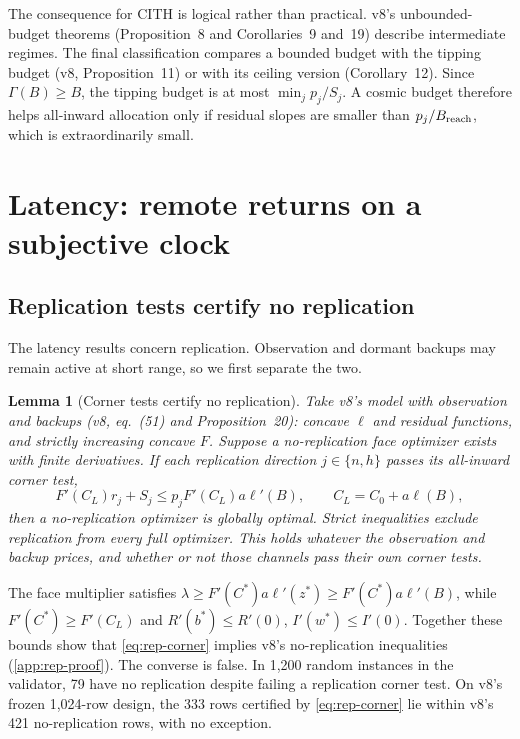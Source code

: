 \documentclass[11pt,a4paper]{article}
\newtheorem{lemma}[proposition]{Lemma}
\theoremstyle{definition}
\newcommand{\CITH}{\textsc{CITH}}
\begin{document}
The consequence for \CITH{} is logical rather than practical. v8's
unbounded-budget theorems (Proposition~8 and Corollaries~9 and~19) describe
intermediate regimes. The final classification compares a bounded budget
with the tipping budget (v8, Proposition~11) or with its ceiling version
(Corollary~12). Since $\Gamma(B)\geq B$, the tipping budget is at most
$\min_jp_j/S_j$. A cosmic budget therefore helps all-inward allocation only if
residual slopes are smaller than $p_j/B_{\rm reach}$, which is extraordinarily
small.

\section{Latency: remote returns on a subjective clock}
\label{sec:latency}
\subsection{Replication tests certify no replication}
The latency results concern replication. Observation and dormant backups may
remain active at short range, so we first separate the two.

\begin{lemma}[Corner tests certify no replication]
\label{lem:rep-certificate}
Take v8's model with observation and backups (v8, eq.~(51) and Proposition~20):
concave $\ell$ and residual functions, and strictly increasing concave $F$. Suppose a
no-replication face optimizer exists with finite derivatives. If each
replication direction $j\in\{n,h\}$ passes its all-inward corner test,
\begin{equation}
 F'(C_L)r_j+S_j\leq p_jF'(C_L)a\ell'(B),\qquad C_L=C_0+a\ell(B),
 \label{eq:rep-corner}
\end{equation}
then a no-replication optimizer is globally optimal. Strict inequalities exclude
replication from every full optimizer. This holds whatever the observation and backup
prices, and whether or not those channels pass their own corner tests.
\end{lemma}
\noindent The face multiplier satisfies $\lambda\geq F'(C^*)a\ell'(z^*)\geq
F'(C^*)a\ell'(B)$, while $F'(C^*)\geq F'(C_L)$ and $R'(b^*)\leq R'(0)$,
$I'(w^*)\leq I'(0)$. Together these bounds show that \cref{eq:rep-corner} implies v8's
no-replication inequalities (\cref{app:rep-proof}). The converse is false. In 1,200
random instances in the validator, 79 have no replication despite failing a
replication corner test. On v8's frozen 1,024-row design, the 333 rows
certified by \cref{eq:rep-corner} lie within v8's 421 no-replication rows, with
no exception.
\end{document}
